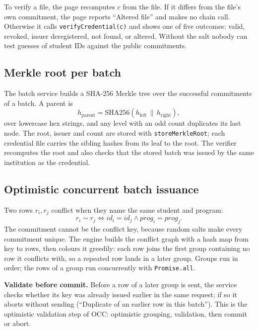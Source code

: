 \documentclass[10pt,twocolumn]{article}
\begin{document}
To verify a file, the page recomputes $c$ from the file. If it differs from the file's own commitment, the page reports ``Altered file'' and makes no chain call. Otherwise it calls \texttt{verifyCredential(c)} and shows one of five outcomes: valid, revoked, issuer deregistered, not found, or altered. Without the salt nobody can test guesses of student IDs against the public commitments.

\subsection{Merkle root per batch}
The batch service builds a SHA-256 Merkle tree over the successful commitments of a batch. A parent is
\begin{equation}
h_{\text{parent}} = \mathrm{SHA256}(h_{\text{left}} \,\|\, h_{\text{right}}),
\end{equation}
over lowercase hex strings, and any level with an odd count duplicates its last node. The root, issuer and count are stored with \texttt{storeMerkleRoot}; each credential file carries the sibling hashes from its leaf to the root. The verifier recomputes the root and also checks that the stored batch was issued by the same institution as the credential.

\subsection{Optimistic concurrent batch issuance}
Two rows $r_i, r_j$ conflict when they name the same student and program:
\begin{equation}
r_i \sim r_j \iff \mathit{id}_i = \mathit{id}_j \wedge \mathit{prog}_i = \mathit{prog}_j .
\end{equation}
The commitment cannot be the conflict key, because random salts make every commitment unique. The engine builds the conflict graph with a hash map from key to rows, then colours it greedily: each row joins the first group containing no row it conflicts with, so a repeated row lands in a later group. Groups run in order; the rows of a group run concurrently with \texttt{Promise.all}.

\textbf{Validate before commit.} Before a row of a later group is sent, the service checks whether its key was already issued earlier in the same request; if so it aborts without sending (``Duplicate of an earlier row in this batch''). This is the optimistic validation step of OCC: optimistic grouping, validation, then commit or abort.
\end{document}

